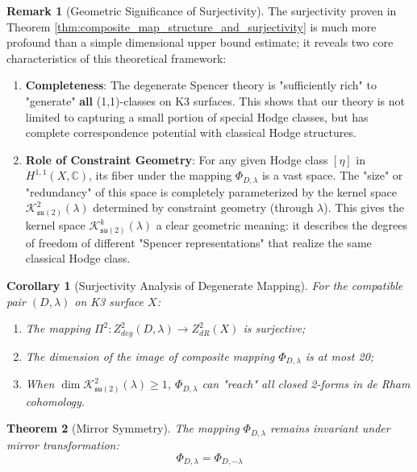 \documentclass[a4paper,12pt]{extarticle}
\theoremstyle{plain}
\newtheorem{theorem}{Theorem}[section]
\newtheorem{corollary}[theorem]{Corollary}
\theoremstyle{definition}
\newtheorem{remark}{Remark}[section]
\begin{document}
\begin{remark}[Geometric Significance of Surjectivity]
\label{rem:geometric_significance_of_surjectivity}
The surjectivity proven in Theorem \ref{thm:composite_map_structure_and_surjectivity} is much more profound than a simple dimensional upper bound estimate; it reveals two core characteristics of this theoretical framework:

\begin{enumerate}
    \item \textbf{Completeness}: The degenerate Spencer theory is "sufficiently rich" to "generate" \textbf{all} (1,1)-classes on K3 surfaces. This shows that our theory is not limited to capturing a small portion of special Hodge classes, but has complete correspondence potential with classical Hodge structures.

    \item \textbf{Role of Constraint Geometry}: For any given Hodge class $[\eta]$ in $H^{1,1}(X, \mathbb{C})$, its fiber under the mapping $\Phi_{D,\lambda}$ is a vast space. The "size" or "redundancy" of this space is completely parameterized by the kernel space $\mathcal{K}_{\mathfrak{su}(2)}^2(\lambda)$ determined by constraint geometry (through $\lambda$). This gives the kernel space $\mathcal{K}_{\mathfrak{su}(2)}^k(\lambda)$ a clear geometric meaning: it describes the degrees of freedom of different "Spencer representations" that realize the same classical Hodge class.
\end{enumerate}
\end{remark}

\begin{corollary}[Surjectivity Analysis of Degenerate Mapping]
\label{cor:surjectivity_analysis}
For the compatible pair $(D,\lambda)$ on K3 surface $X$:
\begin{enumerate}
    \item The mapping $\Pi^2: Z_{deg}^2(D,\lambda) \to Z^2_{dR}(X)$ is surjective;
    \item The dimension of the image of composite mapping $\Phi_{D,\lambda}$ is at most 20;
    \item When $\dim \mathcal{K}_{\mathfrak{su}(2)}^2(\lambda) \geq 1$, $\Phi_{D,\lambda}$ can "reach" all closed 2-forms in de Rham cohomology.
\end{enumerate}
\end{corollary}

\begin{theorem}[Mirror Symmetry]
\label{thm:zheng2025mirrormetry_composite_map}
The mapping $\Phi_{D,\lambda}$ remains invariant under mirror transformation:
$$\Phi_{D,\lambda} = \Phi_{D,-\lambda}$$
\end{theorem}
\end{document}
